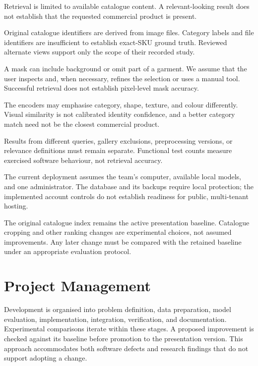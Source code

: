 \begin{description}[leftmargin=0pt,labelindent=0pt,font=\normalfont\bfseries,itemsep=0.6em]
  \item[Catalogue coverage.]
    Retrieval is limited to available catalogue content. A relevant-looking
    result does not establish that the requested commercial product is present.
  \item[Product identity.]
    Original catalogue identifiers are derived from image files. Category labels
    and file identifiers are insufficient to establish exact-SKU ground truth.
    Reviewed alternate views support only the scope of their recorded study.
  \item[Selection quality.]
    A mask can include background or omit part of a garment. We assume that the
    user inspects and, when necessary, refines the selection or uses a manual tool.
    Successful retrieval does not establish pixel-level mask accuracy.
  \item[Pretrained representations.]
    The encoders may emphasise category, shape, texture, and colour differently.
    Visual similarity is not calibrated identity confidence, and a better
    category match need not be the closest commercial product.
  \item[Evaluation comparability.]
    Results from different queries, gallery exclusions, preprocessing versions,
    or relevance definitions must remain separate. Functional test counts measure
    exercised software behaviour, not retrieval accuracy.
  \item[Local operation and data.]
    The current deployment assumes the team's computer, available local models,
    and one administrator. The database and its backups require local protection;
    the implemented account controls do not establish readiness for public,
    multi-tenant hosting.
\end{description}

The original catalogue index remains the active presentation baseline. Catalogue
cropping and other ranking changes are experimental choices, not assumed
improvements. Any later change must be compared with the retained baseline
under an appropriate evaluation protocol.

\section{Project Management}
\label{sec:project-management}

Development is organised into problem definition, data preparation, model
evaluation, implementation, integration, verification, and documentation.
Experimental comparisons iterate within these stages. A proposed improvement is
checked against its baseline before promotion to the presentation version.
This approach accommodates both software defects and research findings that do
not support adopting a change.

